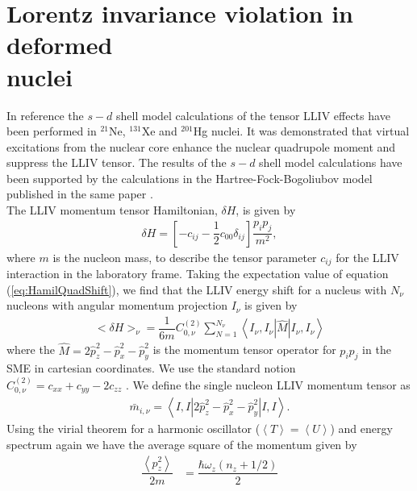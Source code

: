 \documentclass[10pt,a4paper, twoside, openright]{report}
\begin{document}
\section[Lorentz invariance violation  in deformed nuclei]{Lorentz invariance violation  in deformed \\ nuclei} 
In reference \cite{Brown2016} the $s-d$ shell model calculations of the tensor LLIV effects have been performed in $^{21}$Ne, $^{131}$Xe and $^{201}$Hg nuclei. It was demonstrated that virtual excitations from the nuclear core enhance the nuclear quadrupole moment and suppress the LLIV tensor.  The results of the $s-d$ shell model calculations have been supported by the calculations in the Hartree-Fock-Bogoliubov model published in the same paper \cite{Brown2016}.\\
\linebreak
The LLIV momentum tensor Hamiltonian, $\delta H$, is given by  \cite{Kostelecky1999}
\begin{align} \label{eq:HamilQuadShift}
\delta H = \left[-c_{ij} -\dfrac{1}{2}c_{00}\delta_{ij}\right]\dfrac{p_ip_j}{m^2},
\end{align}
 where $m$ is the nucleon mass,  to describe the tensor parameter $c_{ij}$  for the LLIV interaction \cite{Kostelecky1999} in the laboratory frame. 
Taking the expectation value of equation (\ref{eq:HamilQuadShift}), we find that the LLIV energy shift  for a nucleus with $N_{\nu}$ nucleons with angular momentum projection $I_{\nu}$ is given by 
\begin{align} \label{eq:MomentumEnergyShift}
<\delta H>_{\nu} = \dfrac{1}{6m}C_{0, \nu}^{(2)}\sum_{N=1}^{N_{\nu}}\left<I_{\nu},I_{\nu}\left|\hat{M}\right|I_{\nu},I_{\nu}\right> 
\end{align}
where the $\hat{M} = 2\hat{p}_z^2 - \hat{p}_x^2 - \hat{p}_y^2$ is the momentum tensor operator for $p_ip_j$ in the SME in cartesian coordinates. We use the standard notion $C_{0, \nu}^{(2)} = c_{xx} + c_{yy} -2c_{zz}$ \cite{Kostelecky1999}. We define the single nucleon LLIV momentum tensor as
\begin{align} \label{eq:LLIVMomentum}
\bar{m}_{i, \nu} =  \left<I,I\left|2\hat{p}_z^2 - \hat{p}_x^2 - \hat{p}_y^2\right|I,I\right>.
\end{align}
Using the virial theorem for a harmonic oscillator ($\left<T\right>=\left<U\right>$) and energy spectrum again we have the average square of the momentum given by
\begin{align} 
\dfrac{\left<p_z^2\right>}{2m} &= \dfrac{\hbar\omega_z\left(n_z + 1/2\right)}{2} \label{eq:pExpectation}
\end{align}
\end{document}
